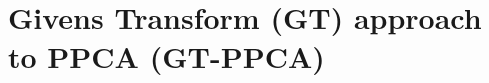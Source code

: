 \documentclass{article}
\begin{document}
\section{Givens Transform (GT) approach to PPCA (GT-PPCA)} \label{Givens}

\end{document}
